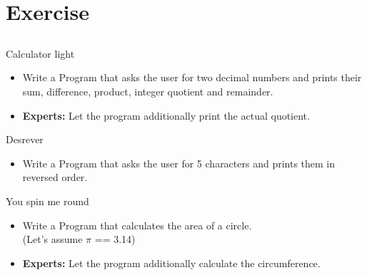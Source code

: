 \section{Exercise}
\subsection{}
\begin{frame}{Calculator light}
	\begin{itemize}
		\item Write a Program that asks the user for two decimal numbers and prints their sum, difference, product, integer quotient and remainder.
		\item \textbf{Experts:} Let the program additionally print the actual quotient.
	\end{itemize}
\end{frame}
\begin{frame}{Desrever}
	\begin{itemize}
		\item Write a Program that asks the user for 5 characters and prints them in reversed order.
	\end{itemize}
\end{frame}
\begin{frame}{You spin me round}
	\begin{itemize}
		\item Write a Program that calculates the area of a circle.\\(Let's assume $\pi$ == 3.14)
		\item \textbf{Experts:} Let the program additionally calculate the circumference.
	\end{itemize}
\end{frame}

